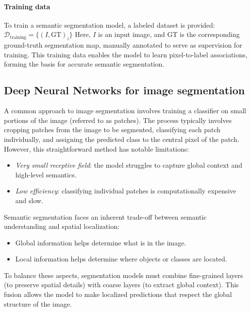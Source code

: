 \paragraph*{Training data}
To train a semantic segmentation model, a labeled dataset is provided:
$\mathcal{D}_{\text{training}} = \{(I, \text{GT})_i\}$
Here, $I$ is an input image, and $\text{GT}$ is the corresponding ground-truth segmentation map, manually annotated to serve as supervision for training.
This training data enables the model to learn pixel-to-label associations, forming the basis for accurate semantic segmentation.

\subsection{Deep Neural Networks for image segmentation}
A common approach to image segmentation involves training a classifier on small portions of the image (referred to as patches). 
The process typically involves cropping patches from the image to be segmented, classifying each patch individually, and assigning the predicted class to the central pixel of the patch.
However, this straightforward method has notable limitations:
\begin{itemize}
    \item \textit{Very small receptive field}: the model struggles to capture global context and high-level semantics.
    \item \textit{Low efficiency}: classifying individual patches is computationally expensive and slow.
\end{itemize}
Semantic segmentation faces an inherent trade-off between semantic understanding and spatial localization:
\begin{itemize}
    \item Global information helps determine what is in the image.
    \item Local information helps determine where objects or classes are located.
\end{itemize}
To balance these aspects, segmentation models must combine fine-grained layers (to preserve spatial details) with coarse layers (to extract global context). 
This fusion allows the model to make localized predictions that respect the global structure of the image.

